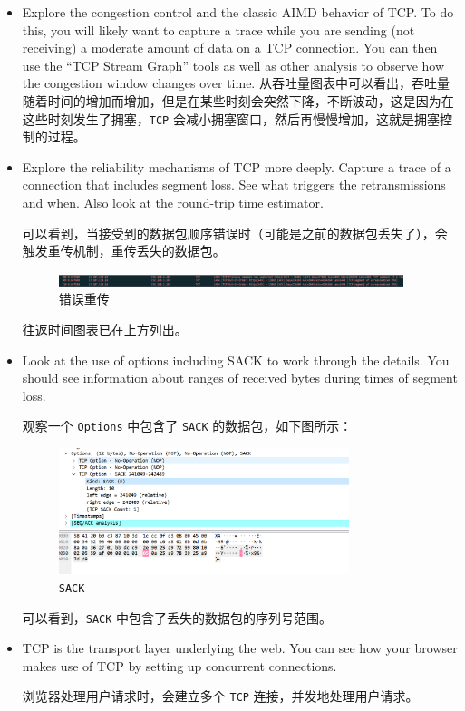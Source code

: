 \documentclass{article}
\begin{document}
\begin{itemize}[noitemsep]
  \item Explore the congestion control and the classic AIMD behavior of TCP. To do this, you will likely want to capture a trace while you are sending (not receiving) a moderate amount of data on a TCP connection. You can then use the “TCP Stream Graph” tools as well as other analysis to observe how the congestion window changes over time.
        从吞吐量图表中可以看出，吞吐量随着时间的增加而增加，但是在某些时刻会突然下降，不断波动，这是因为在这些时刻发生了拥塞，\texttt{TCP} 会减小拥塞窗口，然后再慢慢增加，这就是拥塞控制的过程。
  \item Explore the reliability mechanisms of TCP more deeply. Capture a trace of a connection that includes segment loss. See what triggers the retransmissions and when. Also look at the round-trip time estimator.

        可以看到，当接受到的数据包顺序错误时（可能是之前的数据包丢失了），会触发重传机制，重传丢失的数据包。

        \begin{figure}[H]
          \centering
          \includegraphics[width=0.95\textwidth]{img/15.png}
          \caption{错误重传}
        \end{figure}

        往返时间图表已在上方列出。
  \item Look at the use of options including SACK to work through the details. You should see information about ranges of received bytes during times of segment loss.

        观察一个 \texttt{Options} 中包含了 \texttt{SACK} 的数据包，如下图所示：

        \begin{figure}[H]
          \centering
          \includegraphics[width=0.8\textwidth]{img/16.png}
          \caption{\texttt{SACK}}
        \end{figure}

        可以看到，\texttt{SACK} 中包含了丢失的数据包的序列号范围。
  \item TCP is the transport layer underlying the web. You can see how your browser makes use of TCP by setting up concurrent connections.

        浏览器处理用户请求时，会建立多个 \texttt{TCP} 连接，并发地处理用户请求。

\end{itemize}
\end{document}
